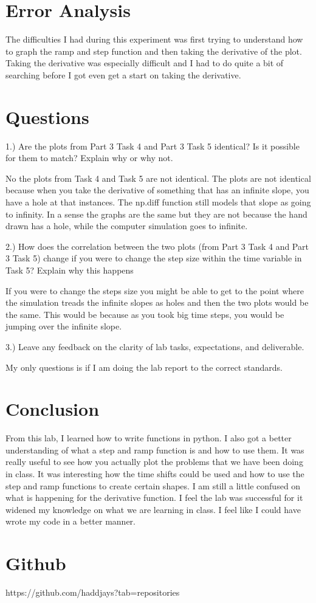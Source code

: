 \documentclass[11pt,a4]{report}
\begin{document}
\section{Error Analysis}

The difficulties I had during this experiment was first trying to understand how to graph the ramp and step function and then taking the derivative of the plot. Taking the derivative was especially difficult and I had to do quite a bit of searching before I got even get a start on taking the derivative. 

\section{Questions}
1.) Are the plots from Part 3 Task 4 and Part 3 Task 5 identical? Is it possible for them to
match? Explain why or why not. 

No the plots from Task 4 and Task 5 are not identical. The plots are not identical because when you take the derivative of something that has an infinite slope, you have a hole at that instances. The np.diff function still models that slope as going to infinity. In a sense the graphs are the same but they are not because the hand drawn has a hole, while the computer simulation goes to infinite. 

2.) How does the correlation between the two plots (from Part 3 Task 4 and Part 3 Task 5)
change if you were to change the step size within the time variable in Task 5? Explain why
this happens

If you were to change the steps size you might be able to get to the point where the simulation treads the infinite slopes as holes and then the two plots would be the same. This would be because as you took big time steps, you would be jumping over the infinite slope.

3.) Leave any feedback on the clarity of lab tasks, expectations, and deliverable.

My only questions is if I am doing the lab report to the correct standards. 


\section{Conclusion}
From this lab, I learned how to write functions in python. I also got a better understanding of what a step and ramp function is and how to use them. It was really useful to see how you actually plot the problems that we have been doing in class. It was interesting how the time shifts could be used and how to use the step and ramp functions to create certain shapes. I am still a little confused on what is happening for the derivative function. I feel the lab was successful for it widened my knowledge on what we are learning in class. I feel like I could have wrote my code in a better manner. 



\section{Github}
https://github.com/haddjays?tab=repositories
\end{document}

